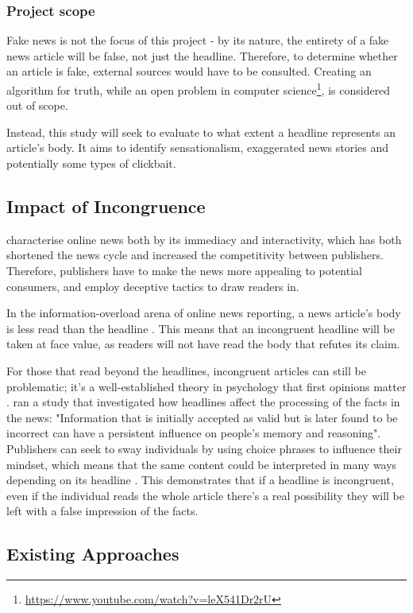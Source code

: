 \subsubsection{Project scope}
Fake news is not the focus of this project - by its nature, the entirety of a fake news article will be false, not just the headline. Therefore, to determine whether an article is fake, external sources would have to be consulted. Creating an algorithm for truth, while an open problem in computer science\footnote{\url{https://www.youtube.com/watch?v=leX541Dr2rU}}, is considered out of scope.

Instead, this study will seek to evaluate to what extent a headline represents an article's body. It aims to identify sensationalism, exaggerated news stories and potentially some types of clickbait.

\subsection{Impact of Incongruence}
 characterise online news both by its immediacy and interactivity, which has both shortened the news cycle and increased the competitivity between publishers. Therefore, publishers have to make the news more appealing to potential consumers, and employ deceptive tactics to draw readers in.

In the information-overload arena of online news reporting, a news article's body is less read than the headline \cite{gabielkov2016}. This means that an incongruent headline will be taken at face value, as readers will not have read the body that refutes its claim.

For those that read beyond the headlines, incongruent articles can still be problematic; it's a well-established theory in psychology that first opinions matter \cite{digirolamo1997}.  ran a study that investigated how headlines affect the processing of the facts in the news:  "Information that is initially accepted as valid but is later found to be incorrect can have a persistent influence on people's memory and reasoning". Publishers can seek to sway individuals by using choice phrases to influence their mindset, which means that the same content could be interpreted in many ways depending on its headline \cite{reis2015}. This demonstrates that if a headline is incongruent, even if the individual reads the whole article there's a real possibility they will be left with a false impression of the facts.


\subsection{Existing Approaches} \label{existing-approaches}

